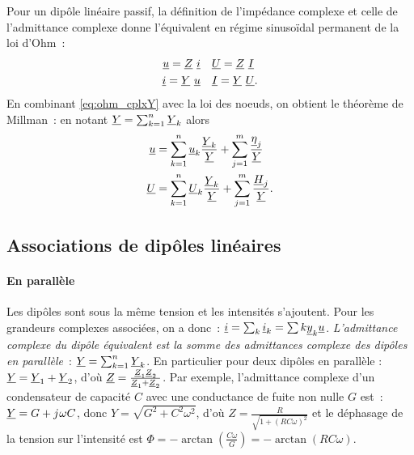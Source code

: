         Pour un dipôle linéaire passif, la définition de l'impédance complexe et celle de l'admittance complexe donne l'équivalent en régime sinusoïdal permanent de la loi d'Ohm~:
        \begin{align}
            \label{eq:ohm_cplxZ}    \underline{u} = \underline{Z} ~ \underline{i} &\quad \underline{U} = \underline{Z} ~ \underline{I} \\
            \label{eq:ohm_cplxY}    \underline{i} = \underline{Y} ~ \underline{u} &\quad \underline{I} = \underline{Y} ~ \underline{U}.
        \end{align}
        En combinant \eqref{eq:ohm_cplxY} avec la loi des noeuds, on obtient le théorème de Millman~: en notant $\underline{Y} = \sum_{k=1}^n \underline{Y}_k$ alors
        \begin{align}
            \underline{u} & = \sum_{k=1}^n \underline{u}_k \frac{\underline{Y}_k}{\underline{Y}} + \sum_{j=1}^m \frac{\underline{\eta}_j}{\underline{Y}} \\
            \underline{U} & = \sum_{k=1}^n \underline{U}_k \frac{\underline{Y}_k}{\underline{Y}} + \sum_{j=1}^m \frac{\underline{H}_j}{\underline{Y}}.
        \end{align}
    \subsection{Associations de dipôles linéaires}
	    \paragraph{En parallèle} Les dipôles sont sous la même tension et les intensités s'ajoutent. Pour les grandeurs complexes associées, on a donc~: $\underline{i} = \sum_k {\underline{i}}_k = \sum{k} {\underline{y}}_k \underline{u} $. \emph{L'admittance complexe du dipôle équivalent est la somme des admittances complexe des dipôles en parallèle}~: $\underline{Y} = \sum_{k=1}^n \underline{Y}_k$. En particulier pour deux dipôles en parallèle : $\underline{Y} = \underline{Y}_1 + \underline{Y}_2$, d'où $\underline{Z} = \frac{\underline{Z}_1 \underline{Z}_2}{\underline{Z}_1+\underline{Z}_2}$. Par exemple, l'admittance complexe d'un condensateur de capacité $C$ avec une conductance de fuite non nulle $G$ est~: $\underline{Y} = G + {j\mkern1mu}\omega C$, donc $Y = \sqrt{G^2 + C^2 \omega^2}$, d'où $Z = \frac{R}{\sqrt{1+(RC\omega)^2}}$ et le déphasage de la tension sur l'intensité est $\Phi = -\arctan\left(\frac{C\omega}{G}\right) = -\arctan(RC\omega)$.
	    
